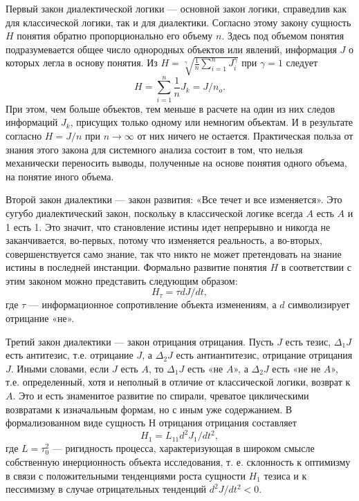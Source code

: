 \documentclass[a4paper,12pt]{report}
\begin{document}
     Первый закон диалектической логики — основной закон логики, справедлив как для классической логики, так и для диалектики. Согласно этому закону сущность $H$ понятия обратно пропорционально его объему $n$. Здесь под объемом понятия подразумевается общее число однородных объектов или явлений, информация $J$ о которых легла в основу понятия. Из $H = \sqrt[ \gamma ]{ \frac{1}{n} \sum_{i = 1}^n J_i^\gamma} $ при $\gamma = 1$ следует
    \begin{equation}
\label{trivial}
H = \sum_{i = 1}^n { \frac{1}{n}  J_k = J/n_o}.
\end{equation} 	
     При этом, чем больше объектов, тем меньше в расчете на один из них следов информаций $J_k$, присущих только одному или немногим объектам. И в результате согласно $H=J/n$ при $n\to\infty$ от них ничего не остается.
Практическая польза от знания этого закона для системного анализа состоит в том, что нельзя механически переносить выводы, полученные на основе понятия одного объема, на понятие иного объема.

     Второй закон диалектики — закон развития: «Все течет и все изменяется». Это сугубо диалектический закон, поскольку в классической логике всегда $A$ есть $A$ и 1 есть 1. Это значит, что становление истины идет непрерывно и никогда не заканчивается, во-первых, потому что изменяется реальность, а во-вторых, совершенствуется само знание, так что никто не может претендовать на знание истины в последней инстанции.
     Формально развитие понятия $H$ в соответствии с этим законом можно представить следующим образом:\\
      \begin{equation}
\label{trivial}
     H_\tau = \tau dJ / dt,
     \end{equation} 	
     где $\tau$ — информационное сопротивление объекта изменениям, а $d$ символизирует отрицание «не».
     
     Третий закон диалектики — закон отрицания отрицания. Пусть $J$ есть тезис, $\Delta_1J$ есть антитезис, т.е. отрицание $J$, а $\Delta_2J$ есть антиантитезис, отрицание отрицания $J$. Иными словами, если $J$ есть $A$, то $\Delta_1J$ есть «не $A$», а $\Delta_2J$ есть «не не $A$», т.е. определенный, хотя и неполный в отличие от классической логики, возврат к $A$. Это и есть знаменитое развитие по спирали, чреватое циклическими возвратами к изначальным формам, но с иным уже содержанием.
     В формализованном виде сущность $Н$ отрицания отрицания составляет
\begin{equation}
\label{trivial}
H_1 = L_11 d^2 J_1 / dt^2 , 	
\end{equation} 	
где $L = \tau_0^2$  — ригидность процесса, характеризующая в широком смысле собственную
инерционность объекта исследования, т. е.
склонность к оптимизму в связи с положительными тенденциями роста сущности $H_1$ тезиса и к пессимизму в случае отрицательных тенденций $d^2 J / dt^2 < 0 $.
     
\end{document}

